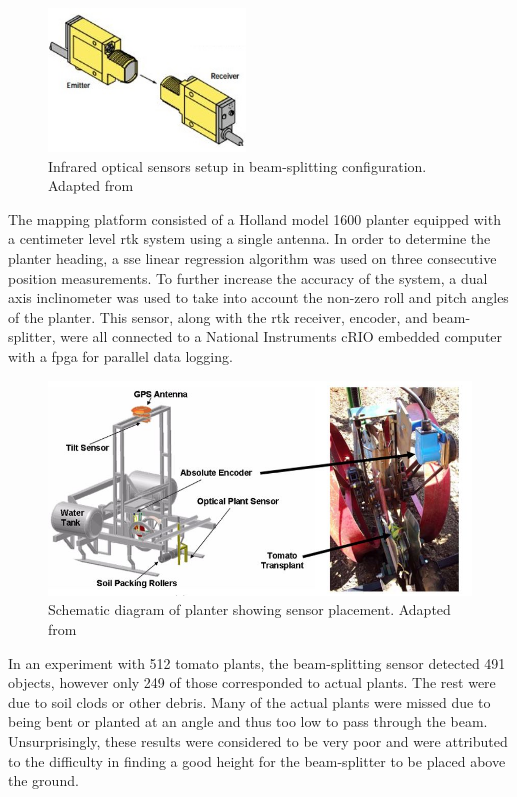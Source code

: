 \begin{figure}
	\centering
    \includegraphics[height=1.5in]{figures/tomator_optical_sensor.jpg}
    \caption[Infrared beam-splitter]{Infrared optical sensors setup in beam-splitting configuration. Adapted from~\citep{Sun:2010}}
    \label{figure:optical_sensor}
\end{figure}

The mapping platform consisted of a Holland model 1600 planter equipped with a centimeter level \ac{rtk} system using a single antenna.  In order to determine the planter heading, a \ac{sse} linear regression algorithm was used on three consecutive position measurements. To further increase the accuracy of the system, a dual axis inclinometer was used to take into account the non-zero roll and pitch angles of the planter.  This sensor, along with the \ac{rtk} receiver, encoder, and beam-splitter, were all connected to a National Instruments cRIO embedded computer with a \ac{fpga} for parallel data logging.    

\begin{figure}
	\centering
    \includegraphics[width=6in]{figures/tomator_planter.jpg}
    \caption[Tomato mapping platform]{Schematic diagram of planter showing sensor placement. Adapted from~\citep{Sun:2010}}
    \label{figure:tomato_planter}
\end{figure}

In an experiment with 512 tomato plants, the beam-splitting sensor detected 491 objects, however only 249 of those corresponded to actual plants.  The rest were due to soil clods or other debris.  Many of the actual plants were missed due to being bent or planted at an angle and thus too low to pass through the beam.  Unsurprisingly, these results were considered to be very poor and were attributed to the difficulty in finding a good height for the beam-splitter to be placed above the ground.

